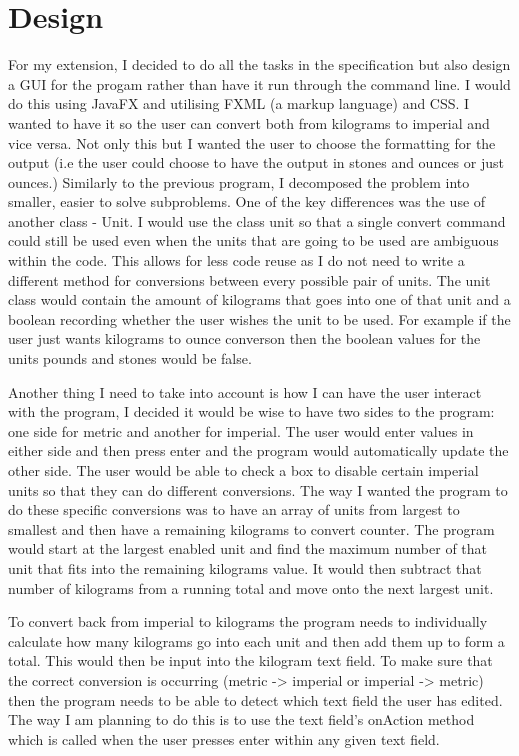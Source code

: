 \documentclass[a4paper]{article}
\begin{document}
\section*{Design}
For my extension, I decided to do all the tasks in the specification but also design a GUI for the progam rather than have it run through the command 
line. I would do this using JavaFX and utilising FXML (a markup language) and CSS. I wanted to have it so the user can convert both from kilograms to 
imperial and vice versa. Not only this but I wanted the user to choose the formatting for the output (i.e the user could choose to have the output in 
stones and ounces or just ounces.) Similarly to the previous program, I decomposed the problem into smaller, easier to solve subproblems. One of the 
key differences was the use of another class - Unit. I would use the class unit so that a single convert command could still be used even when the 
units that are going to be used are ambiguous within the code. This allows for less code reuse as I do not need to write a different method for 
conversions between every possible pair of units. The unit class would contain the amount of kilograms that goes into one of that unit and a boolean 
recording whether the user wishes the unit to be used. For example if the user just wants kilograms to ounce converson then the boolean values for the 
units pounds and stones would be false.

Another thing I need to take into account is how I can have the user interact with the program, I decided it would be wise to have two sides to the 
program: one side for metric and another for imperial. The user would enter values in either side and then press enter and the program would 
automatically update the other side. The user would be able to check a box to disable certain imperial units so that they can do different 
conversions. The way I wanted the program to do these specific conversions was to have an array of units from largest to smallest and then have a 
remaining kilograms to convert counter. The program would start at the largest enabled unit and find the maximum number of that unit that fits into 
the remaining kilograms value. It would then subtract that number of kilograms from a running total and move onto the next largest unit.

To convert back from imperial to kilograms the program needs to individually calculate how many kilograms go into each unit and then add them up to 
form a total. This would then be input into the kilogram text field. To make sure that the correct conversion is occurring (metric -> imperial or 
imperial -> metric) then the program needs to be able to detect which text field the user has edited. The way I am planning to do this is to use the 
text field's onAction method which is called when the user presses enter within any given text field.
\end{document}
